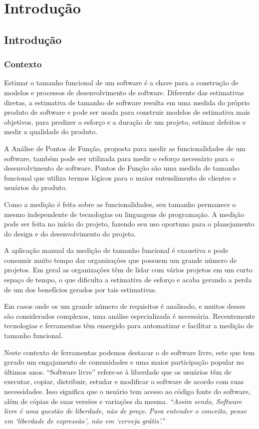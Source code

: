 \part{Introdução}

\chapter[Introdução]{Introdução}

\section{Contexto}

Estimar o tamanho funcional de um software é a chave para a construção de modelos e processos de desenvolvimento de software. Diferente das estimativas diretas, a estimativa de tamanho de software resulta em uma medida do próprio produto de software e pode ser usada para construir modelos de estimativa mais objetivos, para predizer o esforço e a duração de um projeto, estimar defeitos e medir a qualidade do produto. \cite{Ebert:2014}

A Análise de Pontos de Função, proposta para medir as funcionalidades de um software, também pode ser utilizada para medir o esforço necessário para o desenvolvimento de software. Pontos de Função são uma medida de tamanho funcional que utiliza termos lógicos para o maior entendimento de clientes e usuários do produto. \cite{Albrecht:1994}

Como a medição é feita sobre as funcionalidades, seu tamanho permanece o mesmo independente de tecnologias ou linguagens de programação. A medição pode ser feita no início do projeto, fazendo seu uso oportuno para o planejamento do design e do desenvolvimento do projeto. \cite{Kusumoto:2002}

A aplicação manual da medição de tamanho funcional é exaustiva e pode consumir muito tempo dar organizações que possuem um grande número de projetos. Em geral as organizações têm de lidar com vários projetos em um curto espaço de tempo, o que dificulta a estimativa de esforço e acaba gerando a perda de um dos benefícios gerados por tais estimativas. \cite{Ebert:2014}

Em casos onde os um grande número de requisitos é analisado, e muitos desses são considerados complexos, uma análise especializada é necessária. Recentemente tecnologias e ferramentas têm emergido para automatizar e facilitar a medição de tamanho funcional. \cite{Ebert:2014}

Neste contexto de ferramentas podemos destacar o de software livre, este que tem gerado um engajamento de comunidades e uma maior participação popular no últimos anos. \cite{Eilola:2002} \nocite{Anota:2016} ``Software livre''  refere-se à liberdade que os usuários têm de executar, copiar, distribuir, estudar e modificar o software de acordo com suas necessidades. Isso significa que o usuário tem acesso ao código fonte do software, além de cópias de suas versões e variações da mesma. \cite{Stallman:2003}{\textit{``Assim sendo, Software livre é uma questão de liberdade, não de preço. Para entender o conceito, pense em `liberdade de expressão', não em `cerveja grátis'.''}} \cite{Stallman:2003}

